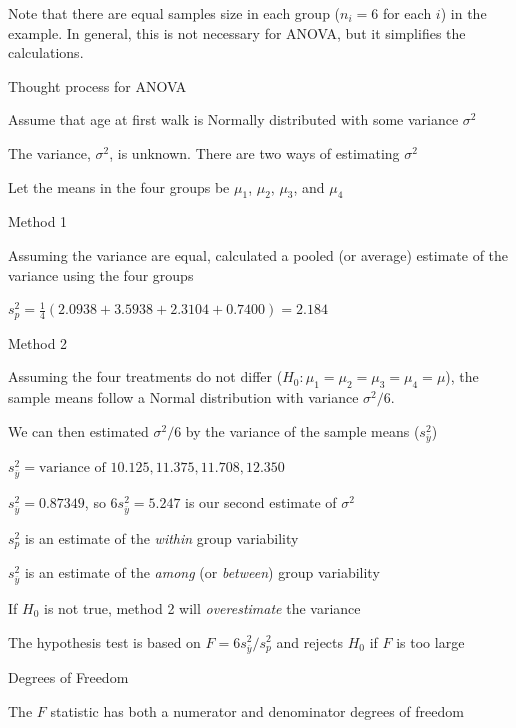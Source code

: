   \item Note that there are equal samples size in each group ($n_i =
    6$ for each $i$) in the example.  In general, this is not
    necessary for ANOVA, but it simplifies the calculations. 
  \item Thought process for ANOVA
   \bi
     \item Assume that age at first walk is Normally distributed with
       some variance $\sigma^2$ 
     \item The variance, $\sigma^2$, is unknown.  There are two ways
       of estimating $\sigma^2$ 
     \item Let the means in the four groups be $\mu_1$, $\mu_2$,
       $\mu_3$, and $\mu_4$ 
     \item Method 1
	\bi 
	  \item Assuming the variance are equal, calculated a pooled (or
      average) estimate of the variance using the four groups 
 	  \item $s^2_p = \frac{1}{4}(2.0938 + 3.5938 + 2.3104 + 0.7400) =
      2.184$ 
	\ei
     \item Method 2
	\bi 
	  \item Assuming the four treatments do not differ ($H_0: \mu_1 =
      \mu_2 = \mu_3 = \mu_4 = \mu$), the sample means follow a Normal
      distribution with variance $\sigma^2/6$. 
          \item We can then estimated $\sigma^2/6$ by the variance of
            the sample means ($s^2_{\overline{y}}$) 
          \item $s^2_{\overline{y}} = \textrm{variance of } {10.125,
              11.375, 11.708, 12.350}$ 
          \item $s^2_{\overline{y}} = 0.87349$, so $6
            s^2_{\overline{y}} = 5.247$ is our second estimate of
            $\sigma^2$ 
        \ei 
     \item $s^2_p$ is an estimate of the \textit{within} group variability
     \item $s^2_{\overline{y}}$ is an estimate of the \textit{among}
       (or \textit{between}) group variability 
     \item If $H_0$ is not true, method 2 will \textit{overestimate}
       the variance 
     \item The hypothesis test is based on $F = 6 s^2_{\overline{y}} /
       s^2_p$ and rejects $H_0$ if $F$ is too large 
   \ei
  \item Degrees of Freedom
   \bi 
     \item The $F$ statistic has both a numerator and denominator degrees of freedom
